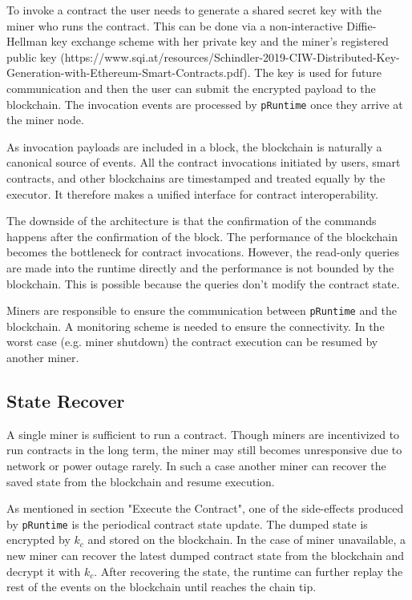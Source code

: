 To invoke a contract the user needs to generate a shared secret key with the miner who runs the contract. This can be done via a non-interactive Diffie-Hellman key exchange scheme with her private key and the miner's registered public key (https://www.sqi.at/resources/Schindler-2019-CIW-Distributed-Key-Generation-with-Ethereum-Smart-Contracts.pdf). The key is used for future communication and then the user can submit the encrypted payload to the blockchain. The invocation events are processed by \texttt{pRuntime} once they arrive at the miner node.

As invocation payloads are included in a block, the blockchain is naturally a canonical source of events. All the contract invocations initiated by users, smart contracts, and other blockchains are timestamped and treated equally by the executor. It therefore makes a unified interface for contract interoperability.

The downside of the architecture is that the confirmation of the commands happens after the confirmation of the block. The performance of the blockchain becomes the bottleneck for contract invocations. However, the read-only queries are made into the runtime directly and the performance is not bounded by the blockchain. This is possible because the queries don't modify the contract state.

Miners are responsible to ensure the communication between \texttt{pRuntime} and the blockchain. A monitoring scheme is needed to ensure the connectivity. In the worst case (e.g. miner shutdown) the contract execution can be resumed by another miner.

\subsection{State Recover}

A single miner is sufficient to run a contract. Though miners are incentivized to run contracts in the long term, the miner may still becomes unresponsive due to network or power outage rarely. In such a case another miner can recover the saved state from the blockchain and resume execution.

As mentioned in section "Execute the Contract", one of the side-effects produced by \texttt{pRuntime}  is the periodical contract state update. The dumped state is encrypted by $k_c$ and stored on the blockchain. In the case of miner unavailable, a new miner can recover the latest dumped contract state from the blockchain and decrypt it with $k_c$. After recovering the state, the runtime can further replay the rest of the events on the blockchain until reaches the chain tip.

